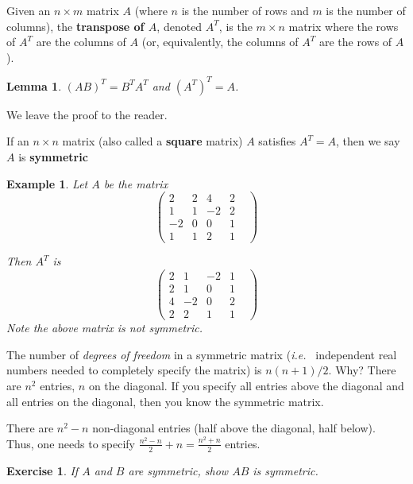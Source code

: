 \documentclass[12pt,letterpaper]{report}
\newcommand\be{\begin{equation}}
\newcommand\ee{\end{equation}}
\newcommand\ie{{\it i.e.\ }}
\newcommand{\tbf}[1]{\textbf{#1}}
\newtheorem{lem}[thm]{Lemma}
\newtheorem{exa}[thm]{Example}
\newtheorem{exe}[thm]{Exercise}
\begin{document}
Given an $n \times m$ matrix $A$ (where $n$ is the number of rows
and $m$ is the number of columns), the \tbf{transpose of $A$},
denoted $A^T$, is the $m \times n$ matrix where the rows of $A^T$
are the columns of $A$ (or, equivalently, the columns of $A^T$ are
the rows of $A$).

\begin{lem} $(AB)^T = B^T A^T$ and $(A^T)^T = A$. \end{lem}

We leave the proof to the reader.

If an $n \times n$ matrix (also called a \tbf{square} matrix) $A$
satisfies $A^T = A$, then we say $A$ is \tbf{symmetric}

\begin{exa} Let $A$ be the matrix
\be \left(\begin{array}{ccccc}
                        2  & 2  &  4 &  2 &  \\
                        1  & 1  & -2 &  2 &  \\
                        -2 & 0  &  0 &  1 &  \\
                        1  & 1  &  2 &  1 &
                          \end{array}\right)
\ee

Then $A^T$ is \be \left(\begin{array}{ccccc}
                        2  & 1  &  -2 &  1 &  \\
                        2  & 1  &  0 &  1 &  \\
                        4 &  -2  &  0 &  2 &  \\
                        2  & 2  &  1 &  1 &
                          \end{array}\right)
\ee Note the above matrix is not symmetric.
\end{exa}

The number of {\em degrees of freedom} in a symmetric matrix (\ie
independent real numbers needed to completely specify the matrix)
is $n(n+1)/2$. Why? There are $n^2$ entries, $n$ on the diagonal.
If you specify all entries above the diagonal and all entries on
the diagonal, then you know the symmetric matrix.

There are $n^2 - n$ non-diagonal entries (half above the diagonal,
half below). Thus, one needs to specify $\frac{n^2 - n}{2} + n =
\frac{n^2 + n}{2}$ entries.


\begin{exe} If $A$ and $B$ are symmetric, show $AB$ is symmetric.
\end{exe}
\end{document}
